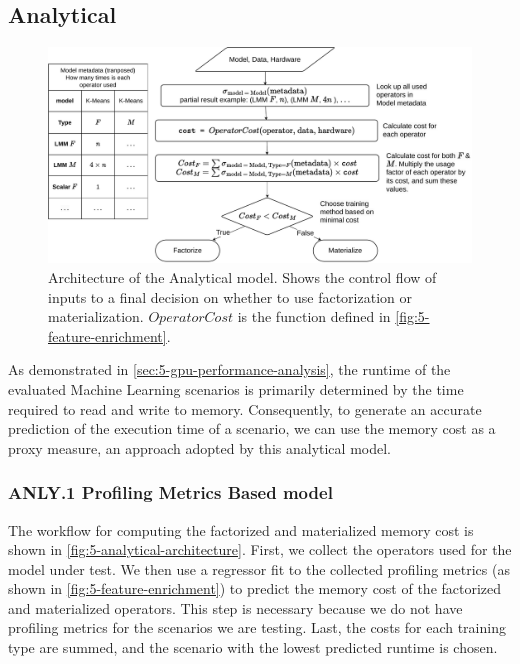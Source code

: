 \subsection{Analytical}
\label{subsec:5-analytical}
\begin{figure}[ht]
  \centering
  \includegraphics[width=\linewidth]{chapters/05_cost_estimation/figures/analytical-architecture.pdf}
  \caption[Analytical model Architecture]{Architecture of the Analytical model. Shows the control flow of inputs to a final decision on whether to use factorization or materialization. $OperatorCost$ is the function defined in \autoref{fig:5-feature-enrichment}.}
  \label{fig:5-analytical-architecture}
\end{figure}

As demonstrated in \autoref{sec:5-gpu-performance-analysis}, the runtime of the evaluated Machine Learning scenarios is primarily determined by the time required to read and write to memory. Consequently, to generate an accurate prediction of the execution time of a scenario, we can use the memory cost as a proxy measure, an approach adopted by this analytical model.

\subsubsection*{ANLY.1 Profiling Metrics Based model}
The workflow for computing the factorized and materialized memory cost is shown in \autoref{fig:5-analytical-architecture}. First, we collect the operators used for the model under test. We then use a regressor fit to the collected profiling metrics (as shown in \autoref{fig:5-feature-enrichment}) to predict the memory cost of the factorized and materialized operators. This step is necessary because we do not have profiling metrics for the scenarios we are testing. Last, the costs for each training type are summed, and the scenario with the lowest predicted runtime is chosen.

